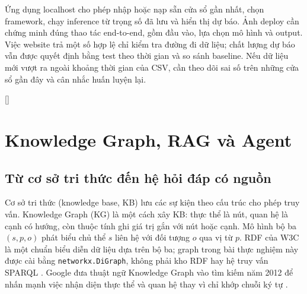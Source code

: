 \documentclass[12pt,a4paper]{report}
\begin{document}
Ứng dụng localhost cho phép nhập hoặc nạp sẵn cửa sổ gần nhất, chọn framework, chạy inference từ trọng số đã lưu và hiển thị dự báo. Ảnh deploy cần chứng minh đúng thao tác end-to-end, gồm đầu vào, lựa chọn mô hình và output. Việc website trả một số hợp lệ chỉ kiểm tra đường đi dữ liệu; chất lượng dự báo vẫn được quyết định bằng test theo thời gian và so sánh baseline. Nếu dữ liệu mới vượt ra ngoài khoảng thời gian của CSV, cần theo dõi sai số trên những cửa sổ gần đây và cân nhắc huấn luyện lại.


\clearpage
\begingroup
\color{red}
\titleformat{\chapter}[display]{\normalfont\bfseries\color{red}}{\filleft\Large\chaptertitlename\ \thechapter}{1ex}{\titlerule\vspace{1ex}\filright\LARGE}[\vspace{1ex}\titlerule]
\titleformat{\section}{\normalfont\Large\bfseries\color{red}}{\thesection}{1em}{}
\titleformat{\subsection}{\normalfont\large\bfseries\color{red}}{\thesubsection}{1em}{}
\hypersetup{linkcolor=red,urlcolor=red,citecolor=red}

\chapter{Knowledge Graph, RAG và Agent}\label{ch:kb-rag}
\section{Từ cơ sở tri thức đến hệ hỏi đáp có nguồn}
Cơ sở tri thức (knowledge base, KB) lưu các sự kiện theo cấu trúc cho phép truy vấn. Knowledge Graph
(KG) là một cách xây KB: thực thể là nút, quan hệ là cạnh có hướng, còn thuộc tính ghi giá trị gắn
với nút hoặc cạnh. Mô hình bộ ba $(s,p,o)$ phát biểu chủ thể $s$ liên hệ với đối tượng $o$ qua
vị từ $p$. RDF của W3C là một chuẩn biểu diễn dữ liệu dựa trên bộ ba; graph trong bài thực nghiệm
này được cài bằng \texttt{networkx.DiGraph}, không phải kho RDF hay hệ truy vấn SPARQL
\cite{essay03-w3c}. Google đưa thuật ngữ Knowledge Graph vào tìm kiếm năm 2012 để nhấn mạnh việc
nhận diện thực thể và quan hệ thay vì chỉ khớp chuỗi ký tự \cite{essay03-google}.
\end{document}
